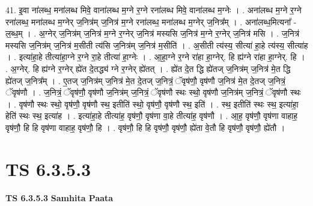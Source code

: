 \documentclass[17pt]{extarticle}
\begin{document}
41. इ॒वा ना॑लब्ध॒ मना॑लब्ध मिवे॒ वाना॑लब्ध म॒ग्ने र॒ग्ने रना॑लब्ध मिवे॒ वाना॑लब्ध म॒ग्नेः । . अना॑लब्ध म॒ग्ने र॒ग्ने रना॑लब्ध॒ मना॑लब्ध म॒ग्नेर् ज॒नित्र॑म् ज॒नित्र॑ म॒ग्ने रना॑लब्ध॒ मना॑लब्ध म॒ग्नेर् ज॒नित्र᳚म् । . अना॑लब्ध॒मित्यना᳚ - ल॒ब्ध॒म् । . अ॒ग्नेर् ज॒नित्र॑म् ज॒नित्र॑ म॒ग्ने र॒ग्नेर् ज॒नित्र॑ मस्यसि ज॒नित्र॑ म॒ग्ने र॒ग्नेर् ज॒नित्र॑ मसि । . ज॒नित्र॑ मस्यसि ज॒नित्र॑म् ज॒नित्र॑ म॒सीती त्य॑सि ज॒नित्र॑म् ज॒नित्र॑ म॒सीति॑ । . अ॒सीती त्य॑स्य॒ सीत्या॑ हा॒हे त्य॑स्य॒ सीत्या॑ह । . इत्या॑हा॒हे तीत्या॑हा॒ग्ने र॒ग्ने रा॒हे तीत्या॑ हा॒ग्नेः । . आ॒हा॒ग्ने र॒ग्ने रा॑हा हा॒ग्नेर्. हि ह्य॑ग्ने रा॑हा हा॒ग्नेर्. हि । . अ॒ग्नेर्. हि ह्य॑ग्ने र॒ग्नेर् ह्ये॑त दे॒तद्ध्य॑ ग्ने र॒ग्नेर् ह्ये॑तत् । . ह्ये॑त दे॒त द्धि ह्ये॑तज् ज॒नित्र॑म् ज॒नित्र॑ मे॒त द्धि ह्ये॑तज् ज॒नित्र᳚म् । . ए॒तज् ज॒नित्र॑म् ज॒नित्र॑ मे॒त दे॒तज् ज॒नित्रं॒ ॅवृष॑णौ॒ वृष॑णौ ज॒नित्र॑ मे॒त दे॒तज् ज॒नित्रं॒ ॅवृष॑णौ । . ज॒नित्रं॒ ॅवृष॑णौ॒ वृष॑णौ ज॒नित्र॑म् ज॒नित्रं॒ ॅवृष॑णौ स्थः स्थो॒ वृष॑णौ ज॒नित्र॑म् ज॒नित्रं॒ ॅवृष॑णौ स्थः । . वृष॑णौ स्थः स्थो॒ वृष॑णौ॒ वृष॑णौ स्थ॒ इतीति॑ स्थो॒ वृष॑णौ॒ वृष॑णौ स्थ॒ इति॑ । . स्थ॒ इतीति॑ स्थः स्थ॒ इत्या॑हा॒ हेति॑ स्थः स्थ॒ इत्या॑ह । . इत्या॑हा॒हे तीत्या॑ह॒ वृष॑णौ॒ वृष॑णा वा॒हे तीत्या॑ह॒ वृष॑णौ । . आ॒ह॒ वृष॑णौ॒ वृष॑णा वाहाह॒ वृष॑णौ॒ हि हि वृष॑णा वाहाह॒ वृष॑णौ॒ हि । . वृष॑णौ॒ हि हि वृष॑णौ॒ वृष॑णौ॒ ह्ये॑ता वे॒तौ हि वृष॑णौ॒ वृष॑णौ॒ ह्ये॑तौ । \newline
\pagebreak
{}

\section{ TS 6.3.5.3 }

\textbf{TS 6.3.5.3 } \newline
\textbf{Samhita Paata} \newline
\end{document}
